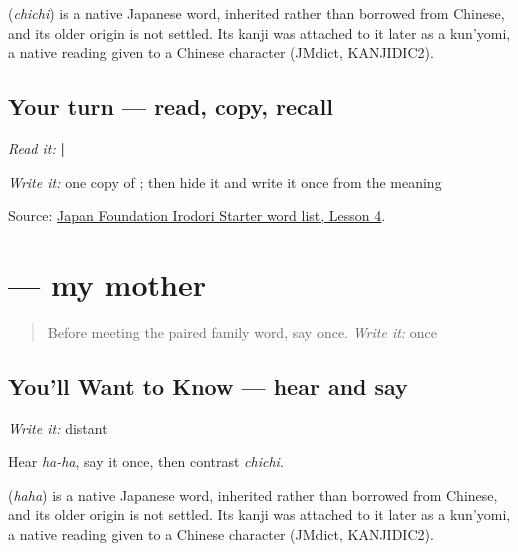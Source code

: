 \begin{cousinweb}
\textbf{} (\emph{chichi}) is a native Japanese word, inherited rather than borrowed from Chinese, and its older origin is not settled. Its kanji was attached to it later as a kun'yomi, a native reading given to a Chinese character (JMdict, KANJIDIC2).
\end{cousinweb}

\subsection*{Your turn — read, copy, recall}
\emph{Read it:} \textbf{ | }

\emph{Write it:} one copy of \textbf{}; then hide it and write it once from the meaning

\begin{tcolorbox}[breakable,colback=teal!4,colframe=teal!35!black,title={Before you move on}]
Source: \href{https://www.irodori.jpf.go.jp/assets/data/wordlist\_X.pdf}{Japan Foundation Irodori Starter word list, Lesson 4}.
\end{tcolorbox}
\section[\texorpdfstring{\ja{はは} (haha)}{はは (haha)}]{ — my mother}

\label{lesson:JA-C13-haha}



\begin{quote}
Before meeting the paired family word, say \textbf{} once. \emph{Write it:} \textbf{} once
\end{quote}

\subsection*{You'll Want to Know — hear and say}
\emph{Write it:} distant \textbf{}

Hear \emph{ha-ha}, say it once, then contrast \emph{chichi}.

\begin{cousinweb}
\textbf{} (\emph{haha}) is a native Japanese word, inherited rather than borrowed from Chinese, and its older origin is not settled. Its kanji was attached to it later as a kun'yomi, a native reading given to a Chinese character (JMdict, KANJIDIC2).
\end{cousinweb}

